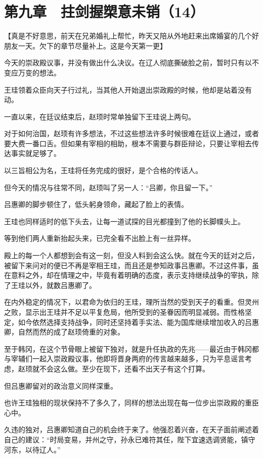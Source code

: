 \section{第九章　拄剑握槊意未销（14）}

【真是不好意思，前天在兄弟婚礼上帮忙，昨天又陪从外地赶来出席婚宴的几个好朋友一天。欠下的章节尽量补上。这是今天第一更】

今天的崇政殿议事，并没有做出什么决议。在辽人彻底撕破脸之前，暂时只有以不变应万变的想法。

王珪领着众臣向天子行过礼，当其他人开始退出崇政殿的时候，他却是站着没有动。

一直以来，在廷议结束后，赵顼时常单独留下王珪说上两句。

对于如何治国，赵顼有许多想法，不过这些想法许多时候很难在廷议上通过，或者要大费一番口舌。但如果有宰相的相助，根本不需要与群臣辩论，只要让宰相去传达事实就足够了。

以三旨相公为名，王珪将任务完成的很好，是个合格的传话人。

但今天的情况与往常不同，赵顼叫了另一人：“吕卿，你且留一下。”

吕惠卿的脚步顿住了，低头躬身领命，藏起了脸上的表情。

王珪也同样适时的低下头去，让每一道试探的目光都撞到了他的长脚幞头上。

等到他们两人重新抬起头来，已完全看不出脸上有一丝异样。

殿上的每一个人都想到会有这一刻，但没人料到会这么快。就在今天的廷对之后，被留下来问对的便已不再是宰相王珪，而且还是参知政事吕惠卿。不过这件事，虽在意料之外，却在情理之中，毕竟有着明确的态度，表示支持继续战争的宰执，除了王珪以外，就数吕惠卿了。

在内外稳定的情况下，以君命为依归的王珪，理所当然的受到天子的看重。但灵州之败，显示出王珪并不足以平复危局，他所受到的圣眷因而明显减弱。而性格坚定，如今依然选择支持战争，同时还坚持着手实法、能为国库继续增加收入的吕惠卿，自然而然的成了赵顼倚重的对象。

至于韩冈，在这个节骨眼上被留下独对，就是升任执政的先兆——最近由于韩冈都与宰辅们一起入崇政殿议事，他即将晋身两府的传言越来越多，只为平息谣言考虑，赵顼就不会这么做。至少在现下，还看不出天子有这个打算。

但吕惠卿留对的政治意义同样深重。

也许王珪独相的现状保持不了多久了，同样的想法出现在每一位步出崇政殿的重臣心中。

久违的独对，吕惠卿知道自己的机会终于来了。他强忍着兴奋，在天子面前阐述着自己的建议：“时局变易，并州之守，孙永已难符其任，陛下宜速选调贤能，镇守河东，以待辽人。”

